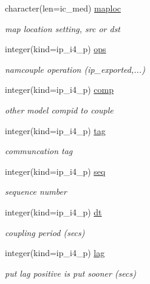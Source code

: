 \begin{DoxyCompactItemize}
character(len=ic\+\_\+med) \hyperlink{structmod__oasis__coupler_1_1prism__coupler__type_aab6763e489b8ace8cff0fbe9e62cbcd8}{maploc}
\begin{DoxyCompactList}\small\item\em map location setting, src or dst \end{DoxyCompactList}\item 
integer(kind=ip\+\_\+i4\+\_\+p) \hyperlink{structmod__oasis__coupler_1_1prism__coupler__type_ac041ba5de191fa34468f61a674dd5bac}{ops}
\begin{DoxyCompactList}\small\item\em namcouple operation (ip\+\_\+exported,...) \end{DoxyCompactList}\item 
integer(kind=ip\+\_\+i4\+\_\+p) \hyperlink{structmod__oasis__coupler_1_1prism__coupler__type_a77cc2858814776053af5f3958d29fee2}{comp}
\begin{DoxyCompactList}\small\item\em other model compid to couple \end{DoxyCompactList}\item 
integer(kind=ip\+\_\+i4\+\_\+p) \hyperlink{structmod__oasis__coupler_1_1prism__coupler__type_a3b8e0d2cd3f3001b4c82e7a911008a37}{tag}
\begin{DoxyCompactList}\small\item\em communcation tag \end{DoxyCompactList}\item 
integer(kind=ip\+\_\+i4\+\_\+p) \hyperlink{structmod__oasis__coupler_1_1prism__coupler__type_af1766ab1d9fe55670c551a9d0c7f2e00}{seq}
\begin{DoxyCompactList}\small\item\em sequence number \end{DoxyCompactList}\item 
integer(kind=ip\+\_\+i4\+\_\+p) \hyperlink{structmod__oasis__coupler_1_1prism__coupler__type_ae1c1191f9aa4664aac2b819d1648320d}{dt}
\begin{DoxyCompactList}\small\item\em coupling period (secs) \end{DoxyCompactList}\item 
integer(kind=ip\+\_\+i4\+\_\+p) \hyperlink{structmod__oasis__coupler_1_1prism__coupler__type_a5f95dd90844b18f8c619df9371a556c6}{lag}
\begin{DoxyCompactList}\small\item\em put lag positive is put sooner (secs) \end{DoxyCompactList}\item 

\end{DoxyCompactItemize}
